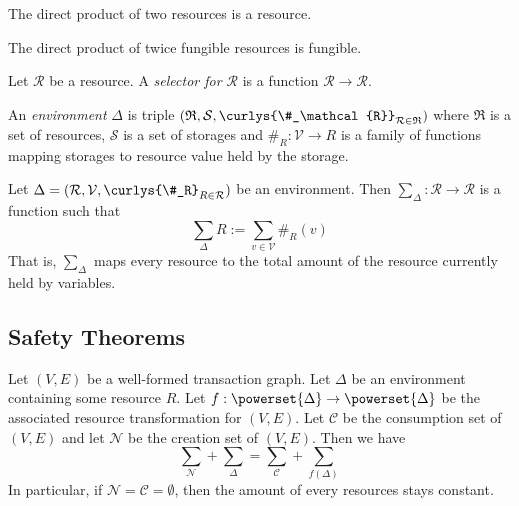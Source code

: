 \documentclass[10pt]{article}
\begin{document}
\begin{remark}
    The direct product of two resources is a resource.
\end{remark}

\begin{proposition}
    The direct product of twice fungible resources is fungible.
\end{proposition}

\begin{definition}
    Let $\mathcal{R}$ be a resource.
    A \emph{selector for $\mathcal{R}$} is a function $\mathcal{R} \to \mathcal{R}$.
\end{definition}

\begin{definition}
    An \emph{environment} $\Delta$ is triple $(\mathfrak{R}, \mathcal{S}, \curlys{\#_\mathcal{R}}_{\mathcal{R} \in \mathfrak{R}})$ where $\mathfrak{R}$ is a set of resources, $\mathcal{S}$ is a set of storages and $\#_R : \mathcal{V} \to R$ is a family of functions mapping storages to resource value held by the storage.
\end{definition}


\begin{definition}
    Let $\Delta = (\mathcal{R}, \mathcal{V}, \curlys{\#_R}_{R \in \mathcal{R}})$ be an environment.
    Then $\sum_\Delta : \mathcal{R} \to \mathcal{R}$ is a function such that
    \[
        \sum_{\Delta} R := \sum_{v \in \mathcal{V}} \#_R(v)
    \]
    That is, $\sum_\Delta$ maps every resource to the total amount of the resource currently held by variables.
\end{definition}

\subsection{Safety Theorems}

\begin{theorem}
    Let $(V, E)$ be a well-formed transaction graph.
    Let $\Delta$ be an environment containing some resource $R$.
    Let $f : \powerset{\Delta} \to \powerset{\Delta}$ be the associated resource transformation for $(V, E)$.
    Let $\mathcal{C}$ be the consumption set of $(V, E)$ and let $\mathcal{N}$ be the creation set of $(V, E)$.
    Then we have
    \[
        \sum_\mathcal{N} + \sum_\Delta = \sum_\mathcal{C} + \sum_{f(\Delta)}
    \]
    In particular, if $\mathcal{N} = \mathcal{C} = \emptyset$, then the amount of every resources stays constant.
\end{theorem}
\end{document}
